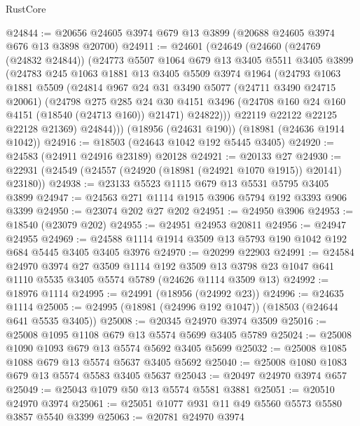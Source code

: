 \begin{lexlean}{RustCore}
\begin{coremodule}
@24844 := @20656 @24605 @3974 @679 @13 @3899 (@20688 @24605 @3974 @676 @13 @3898 @20700)
@24911 := @24601
    (@24649
      (@24660
        (@24769 (@24832 @24844))
        (@24773
          @5507
          @1064
          @679
          @13
          @3405
          @5511
          @3405
          @3899
          (@24783
            @245
            @1063
            @1881
            @13
            @3405
            @5509
            @3974
            @1964
            (@24793
              @1063
              @1881
              @5509
              (@24814
                @967
                @24
                @31
                @3490
                @5077
                (@24711 @3490 @24715 @20061)
                (@24798
                  @275
                  @285
                  @24
                  @30
                  @4151
                  @3496
                  (@24708 @160 @24 @160 @4151 (@18540 (@24713 @160)) @21471)
                  @24822)))
            @22119
            @22122
            @22125
            @22128
            @21369)
          @24844)))
    (@18956 (@24631 @190))
    (@18981 (@24636 @1914 @1042))
@24916 := @18503 (@24643 @1042 @192 @5445 @3405)
@24920 := @24583 (@24911 @24916 @23189) @20128
@24921 := @20133 @27
@24930 := @22931 (@24549 (@24557 (@24920 (@18981 (@24921 @1070 @1915)) @20141) @23180))
@24938 := @23133 @5523 @1115 @679 @13 @5531 @5795 @3405 @3899
@24947 := @24563 @271 @1114 @1915 @3906 @5794 @192 @3393 @906 @3399
@24950 := @23074 @202 @27 @202
@24951 := @24950 @3906
@24953 := @18540 (@23079 @202)
@24955 := @24951 @24953 @20811
@24956 := @24947 @24955
@24969 := @24588 @1114 @1914 @3509 @13 @5793 @190 @1042 @192 @684 @5445 @3405 @3405 @3976
@24970 := @20299 @22903
@24991 := @24584
    @24970
    @3974
    @27
    @3509
    @1114
    @192
    @3509
    @13
    @3798
    @23
    @1047
    @641
    @1110
    @5535
    @3405
    @5574
    @5789
    (@24626 @1114 @3509 @13)
@24992 := @18976 @1114
@24995 := @24991 (@18956 (@24992 @23))
@24996 := @24635 @1114
@25005 := @24995 (@18981 (@24996 @192 @1047)) (@18503 (@24644 @641 @5535 @3405))
@25008 := @20345 @24970 @3974 @3509
@25016 := @25008 @1095 @1108 @679 @13 @5574 @5699 @3405 @5789
@25024 := @25008 @1090 @1093 @679 @13 @5574 @5692 @3405 @5699
@25032 := @25008 @1085 @1088 @679 @13 @5574 @5637 @3405 @5692
@25040 := @25008 @1080 @1083 @679 @13 @5574 @5583 @3405 @5637
@25043 := @20497 @24970 @3974 @657
@25049 := @25043 @1079 @50 @13 @5574 @5581 @3881
@25051 := @20510 @24970 @3974
@25061 := @25051 @1077 @931 @11 @49 @5560 @5573 @5580 @3857 @5540 @3399
@25063 := @20781 @24970 @3974

\end{coremodule}
\end{lexlean}
